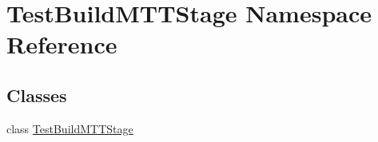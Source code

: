 \hypertarget{namespace_test_build_m_t_t_stage}{\section{Test\-Build\-M\-T\-T\-Stage Namespace Reference}
\label{namespace_test_build_m_t_t_stage}
}
\subsection*{Classes}
\begin{DoxyCompactItemize}
\item 
class \hyperlink{class_test_build_m_t_t_stage_1_1_test_build_m_t_t_stage}{Test\-Build\-M\-T\-T\-Stage}
\end{DoxyCompactItemize}
